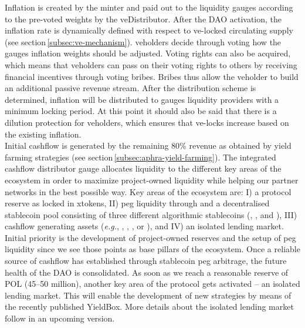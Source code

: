 Inflation is created by the \aphra minter and paid out to the liquidity gauges according to the pre-voted weights by the veDistributor.
After the DAO activation, the inflation rate is dynamically defined with respect to ve-locked circulating supply (see section\,\ref{subsec:ve-mechanism}).
ve\aphra holders decide through voting how the gauges inflation weights should be adjusted.
Voting rights can also be acquired, which means that ve\aphra holders can pass on their voting rights to others by receiving financial incentives through voting bribes.
Bribes thus allow the ve\aphra holder to build an additional passive revenue stream.
After the distribution scheme is determined, inflation will be distributed to gauges liquidity providers with a minimum locking period.
At this point it should also be said that there is a dilution protection for ve\aphra holders, which ensures that ve-locks increase based on the existing inflation.\\[-1em]

Initial cashflow is generated by the remaining 80\% revenue as obtained by \aphra yield farming strategies (see section\,\ref{subsec:aphra-yield-farming}).
The integrated cashflow distributor gauge allocates liquidity to the different key areas of the ecosystem in order to maximize project-owned liquidity while helping our partner networks in the best possible way.
Key areas of the ecosystem are: I) a protocol reserve as locked in x\vader tokens, II) peg liquidity through \crv and a decentralised stablecoin pool consisting of three different algorithmic stablecoins (\usdv,\cite{vader} \bean,\cite{bean} and \frax\cite{frax}), III) cashflow generating assets (\textit{e.g.}, \crv,\cite{curve} \fxs,\cite{frax} \rpl,\cite{rocket-pool} or \yfi\cite{yearn-finance}), and IV) an isolated lending market. 
Initial priority is the development of project-owned reserves and the setup of peg liquidity since we see those points as base pillars of the ecosystem.
Once a reliable source of cashflow has established through stablecoin peg arbitrage, the future health of the \aphra DAO is consolidated.
As soon as we reach a reasonable reserve of POL (45--50 million), another key area of the protocol gets activated -- an isolated lending market.
This will enable the development of new strategies by means of the recently published YieldBox.\cite{yieldbox,boringcrypto}
More details about the isolated lending market follow in an upcoming version.

